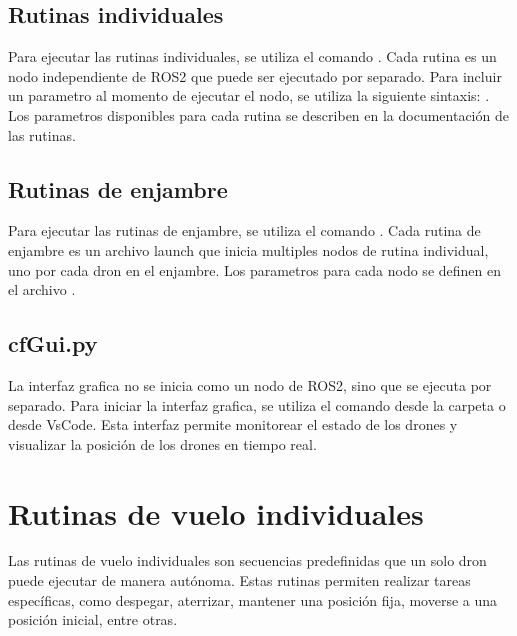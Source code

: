 \documentclass[a4paper,11pt,spanish]{sphinxmanual}
\begin{document}
\section{Rutinas individuales}
\label{\detokenize{comandos:rutinas-individuales}}
\sphinxAtStartPar
Para ejecutar las rutinas individuales, se utiliza el comando . Cada rutina es un nodo independiente de ROS2 que puede ser ejecutado por separado. Para incluir un parametro al momento de ejecutar el nodo, se utiliza la siguiente sintaxis: . Los parametros disponibles para cada rutina se describen en la documentación de las rutinas.


\section{Rutinas de enjambre}
\label{\detokenize{comandos:rutinas-de-enjambre}}
\sphinxAtStartPar
Para ejecutar las rutinas de enjambre, se utiliza el comando . Cada rutina de enjambre es un archivo launch que inicia multiples nodos de rutina individual, uno por cada dron en el enjambre. Los parametros para cada nodo se definen en el archivo .


\section{cfGui.py}
\label{\detokenize{comandos:cfgui-py}}
\sphinxAtStartPar
La interfaz grafica no se inicia como un nodo de ROS2, sino que se ejecuta por separado. Para iniciar la interfaz grafica, se utiliza el comando  desde la carpeta  o desde VsCode. Esta interfaz permite monitorear el estado de los drones y visualizar la posición de los drones en tiempo real.

\sphinxstepscope


\chapter{Rutinas de vuelo individuales}
\label{\detokenize{rutinas_individuales:rutinas-de-vuelo-individuales}}\label{\detokenize{rutinas_individuales::doc}}
\sphinxAtStartPar
Las rutinas de vuelo individuales son secuencias predefinidas que un solo dron puede ejecutar de manera autónoma. Estas rutinas permiten realizar tareas específicas, como despegar, aterrizar, mantener una posición fija, moverse a una posición inicial, entre otras.
\end{document}
